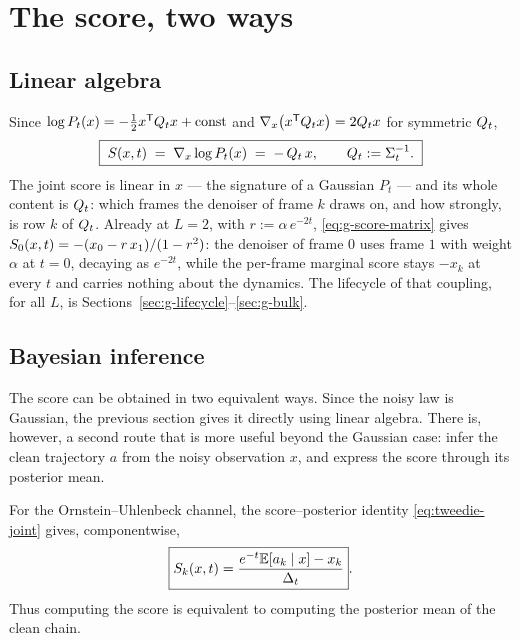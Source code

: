 \section{The score, two ways}\label{sec:g-score}

\subsection{Linear algebra}

Since $\log P_t(x) = -\tfrac12 x^{\mathsf{T}} Q_t x + \mathrm{const}$ and
$\nabla_x\big(x^{\mathsf{T}} Q_t x\big) = 2Q_t x$ for symmetric $Q_t$,
\begin{equation}
  \boxed{\;S(x, t) \;=\; \nabla_x \log P_t(x) \;=\; -\,Q_t\, x,
  \qquad Q_t := \Sigma_t^{-1}.\;}
  \label{eq:g-score-matrix}
\end{equation}
The joint score is linear in $x$ --- the signature of a Gaussian $P_t$ --- and
its whole content is $Q_t$: which frames the denoiser of frame $k$ draws on,
and how strongly, is row $k$ of $Q_t$. Already at $L = 2$, with
$r := \alpha\, e^{-2t}$, \eqref{eq:g-score-matrix} gives
$S_0(x,t) = -(x_0 - r\,x_1)/(1-r^2)$: the denoiser of frame $0$ uses frame
$1$ with weight $\alpha$ at $t = 0$, decaying as $e^{-2t}$, while the per-frame
marginal score stays $-x_k$ at every $t$ and carries nothing about the
dynamics. The lifecycle of that coupling, for all $L$, is
Sections~\ref{sec:g-lifecycle}--\ref{sec:g-bulk}.


\subsection{Bayesian inference}

The score can be obtained in two equivalent ways. Since the noisy law is
Gaussian, the previous section gives it directly using linear algebra.
There is, however, a second route that is more useful beyond the Gaussian
case: infer the clean trajectory $a$ from the noisy observation $x$, and
express the score through its posterior mean.

For the Ornstein--Uhlenbeck channel,
the score--posterior identity \eqref{eq:tweedie-joint} gives, componentwise,
\begin{equation}
  \boxed{
  S_k(x,t)
  =
  \frac{e^{-t}\mathbb{E}[a_k\mid x]-x_k}{\Delta_t}
  }.
  \label{eq:g-tweedie}
\end{equation}
Thus computing the score is equivalent to computing the posterior mean of
the clean chain.

